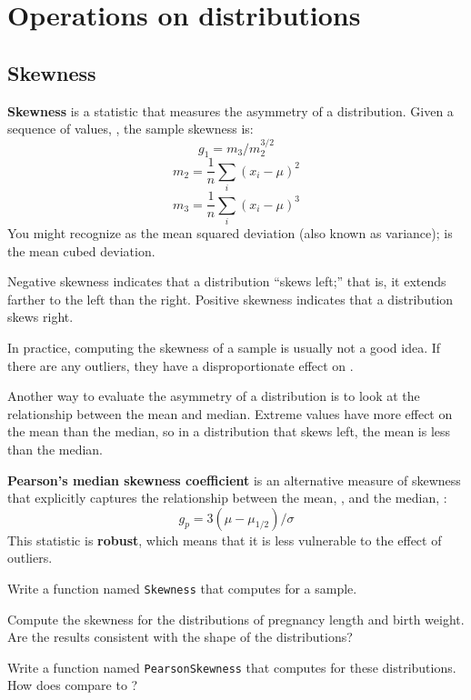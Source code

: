 \documentclass[12pt]{book}
\begin{document}
\chapter{Operations on distributions}
\label{operations}

\section{Skewness}

{\bf Skewness} is a statistic that measures the asymmetry of a
distribution.  Given a sequence of values, \xsubi, the sample skewness
is:
%
\[ g_1 = {m_3} / {m_2^{3/2}}\]
%
\[ m_2 = \frac{1}{n} \sum_i (x_i - \mu)^2 \]
%
\[ m_3 = \frac{1}{n} \sum_i (x_i - \mu)^3 \]
%
You might recognize \m{} as the mean squared deviation (also known as
variance); \m{} is the mean cubed deviation.

Negative skewness indicates that a distribution 
``skews left;'' that is, it extends
farther to the left than the right.  Positive skewness indicates
that a distribution skews right.

In practice, computing the skewness of a sample is usually not
a good idea.  If there are any outliers, they
have a disproportionate effect on \gee {}.

Another way to evaluate the asymmetry of a distribution is to look
at the relationship between the mean and median.
Extreme values have more effect on the mean than the median, so
in a distribution that skews left, the mean is less than the median.

{\bf Pearson's median skewness coefficient} is an alternative measure
of skewness that explicitly captures the relationship between the
mean, \mymu, and the median, \mymu {}:
%
\[ g_p = 3 (\mu - \mu_{1/2}) / \sigma \]
%
This statistic is {\bf robust}, which means that it is less vulnerable
to the effect of outliers.

\begin{exercise}
Write a function named {\tt Skewness} that computes
\gee {} for a sample.

Compute the skewness for the distributions of pregnancy length and
birth weight.  Are the results consistent with the shape of the
distributions?

Write a function named {\tt PearsonSkewness} that computes \gee {}
for these distributions.  How does \gee {} compare to \gee {}?

\end{exercise}
\end{document}
